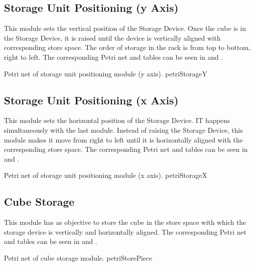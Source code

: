 \subsection{Storage Unit Positioning (y Axis)}
This module sets the vertical position of the Storage Device. Once the cube is
in the Storage Device, it is raised until the device is vertically aligned with
corresponding store space. The order of storage in the rack is from top to
bottom, right to left.   
The corresponding Petri net and tables can be seen in
 and .


{Petri net of storage unit positioning module (y axis).}
{petriStorageY}
\subsection{Storage Unit Positioning (x Axis)}
This module sets the horizontal position of the Storage Device. IT happens
simultaneously with the last module. Instead of raising the Storage Device, this
module makes it move from right to left until it is horizontally aligned with the
corresponding store space.  
The corresponding Petri net and tables can be seen in
 and .


{Petri net of storage unit positioning module (x axis).}
{petriStorageX}
\subsection{Cube Storage}
This module has as objective to store the cube in the store space with which the
storage device is vertically and horizontally aligned. 
The corresponding Petri net and tables can be seen in
 and .


{Petri net of cube storage module.}
{petriStorePiece}
